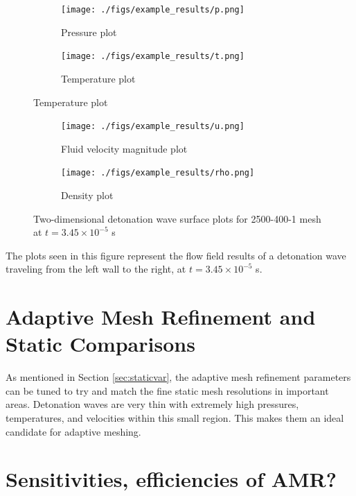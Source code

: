 \begin{figure}[]
    \centering
    \begin{subfigure}[]{\textwidth}
        \centering
        \texttt{[image: ./figs/example\_results/p.png]}
        \caption{Pressure plot}
    \end{subfigure}

    \begin{subfigure}[]{\textwidth}
        \centering
        \texttt{[image: ./figs/example\_results/t.png]}
        \caption{Temperature plot}
    \end{subfigure}

\end{figure}
\begin{figure} \ContinuedFloat
    
    \begin{subfigure}[]{\textwidth}
        \centering
        \texttt{[image: ./figs/example\_results/u.png]}
        \caption{Fluid velocity magnitude plot}
    \end{subfigure}

    \begin{subfigure}[]{\textwidth}
        \centering
        \texttt{[image: ./figs/example\_results/rho.png]}
        \caption{Density plot}
    \end{subfigure}

    \caption{Two-dimensional detonation wave surface plots for 2500-400-1 mesh at \(t = 3.45 \times 10^{ - 5} \) s}
    \label{fig:2dsurface}
\end{figure}%
\noindent The plots seen in this figure represent the flow field results of a detonation wave traveling from the left wall to the right, at \(t = 3.45 \times 10^{ - 5} \) s. 





\section{Adaptive Mesh Refinement and Static Comparisons}
As mentioned in Section \ref{sec:staticvar}, the adaptive mesh refinement parameters can be tuned to try and match the fine static mesh resolutions in important areas. Detonation waves are very thin with extremely high pressures, temperatures, and velocities within this small region. This makes them an ideal candidate for adaptive meshing. 



\section{Sensitivities, efficiencies of AMR?}